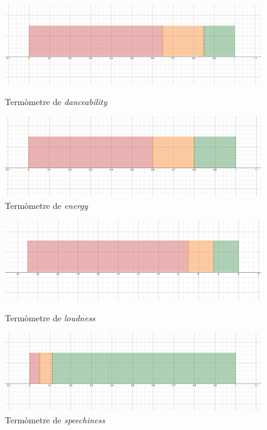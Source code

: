 \begin{figure}[H]
\centering
    \begin{minipage}{.49\textwidth}
        \centering
        \includegraphics[width=0.95\linewidth]{Images/5_TLP/danceability_term.png}
        \caption{Termòmetre de \emph{danceability}}
        \label{fig:5_TLP:danceability}
    \end{minipage}%
    \begin{minipage}{.49\textwidth}
        \centering
        \includegraphics[width=0.95\linewidth]{Images/5_TLP/energy_term.png}
        \caption{Termòmetre de \emph{energy}}
        \label{fig:5_TLP:energy}
    \end{minipage}%
\end{figure}

\begin{figure}[H]
\centering
    \begin{minipage}{.49\textwidth}
        \centering
        \includegraphics[width=0.95\linewidth]{Images/5_TLP/loudness_term.png}
        \caption{Termòmetre de \emph{loudness}}
        \label{fig:5_TLP:loudness}
    \end{minipage}%
    \begin{minipage}{.49\textwidth}
        \centering
        \includegraphics[width=0.95\linewidth]{Images/5_TLP/speechiness_term.png}
        \caption{Termòmetre de \emph{speechiness}}
        \label{fig:5_TLP:speechiness}
    \end{minipage}%
\end{figure}

